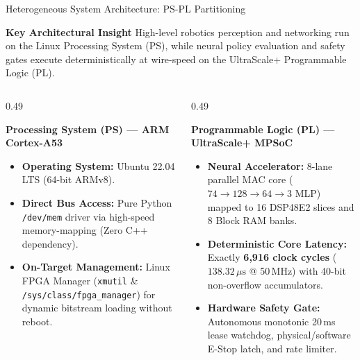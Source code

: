 \documentclass[aspectratio=169,10pt]{beamer}
\begin{document}
\begin{frame}{Heterogeneous System Architecture: PS-PL Partitioning}
    \begin{block}{\textbf{Key Architectural Insight}}
        High-level robotics perception and networking run on the Linux Processing System (PS), while neural policy evaluation and safety gates execute deterministically at wire-speed on the UltraScale+ Programmable Logic (PL).
    \end{block}
    
    \vspace{0.1em}
    \begin{columns}[T]
        \begin{column}{0.49\textwidth}
            \begin{block}{\textbf{Processing System (PS) — ARM Cortex-A53}}
                \begin{itemize}\footnotesize\setlength{\itemsep}{1pt}
                    \item \textbf{Operating System:} Ubuntu 22.04 LTS (64-bit ARMv8).
                    \item \textbf{Direct Bus Access:} Pure Python \texttt{/dev/mem} driver via high-speed memory-mapping (Zero C++ dependency).
                    \item \textbf{On-Target Management:} Linux FPGA Manager (\texttt{xmutil} \& \texttt{/sys/class/fpga\_manager}) for dynamic bitstream loading without reboot.
                \end{itemize}
            \end{block}
        \end{column}
        
        \begin{column}{0.49\textwidth}
            \begin{block}{\textbf{Programmable Logic (PL) — UltraScale+ MPSoC}}
                \begin{itemize}\footnotesize\setlength{\itemsep}{1pt}
                    \item \textbf{Neural Accelerator:} 8-lane parallel MAC core ($74 \rightarrow 128 \rightarrow 64 \rightarrow 3$ MLP) mapped to 16 DSP48E2 slices and 8 Block RAM banks.
                    \item \textbf{Deterministic Core Latency:} Exactly \textbf{6,916 clock cycles} ($138.32\,\mu\text{s}$ @ 50\,MHz) with 40-bit non-overflow accumulators.
                    \item \textbf{Hardware Safety Gate:} Autonomous monotonic 20\,ms lease watchdog, physical/software E-Stop latch, and rate limiter.
                \end{itemize}
            \end{block}
        \end{column}
    \end{columns}
\end{frame}
\end{document}
